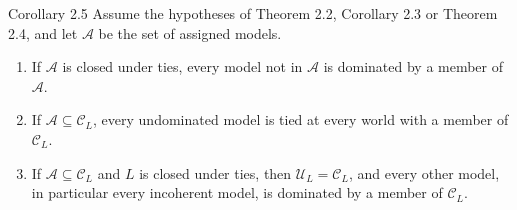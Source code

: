 \documentclass[11pt]{article}
\newcommand{\C}{\mathcal C}
\newcommand{\U}{\mathcal U}
\begin{document}
\begin{stmt}{Corollary 2.5}
Assume the hypotheses of Theorem 2.2, Corollary 2.3 or Theorem 2.4, and let $\mathcal A$ be the set of assigned models.
\begin{enumerate}[label=(\alph*)]
\item If $\mathcal A$ is closed under ties, every model not in $\mathcal A$ is dominated by a member of $\mathcal A$.
\item If $\mathcal A\subseteq\C_L$, every undominated model is tied at every world with a member of $\C_L$.
\item If $\mathcal A\subseteq\C_L$ and $L$ is closed under ties, then $\U_L=\C_L$, and every other model, in particular every incoherent model, is dominated by a member of $\C_L$.
\end{enumerate}
\end{stmt}
\end{document}
